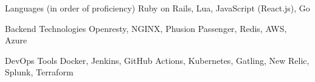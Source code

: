 

\begin{cvskills}

  \cvskill
    {Languages (in order of proficiency)} %
    {Ruby on Rails, Lua, JavaScript (React.js), Go} %


  \cvskill
    {Backend Technologies} %
    {Openresty, NGINX, Phusion Passenger, Redis, AWS, Azure} %

  \cvskill
    {DevOps Tools} %
    {Docker, Jenkins, GitHub Actions, Kubernetes, Gatling, New Relic, Splunk, Terraform} %

\end{cvskills}
